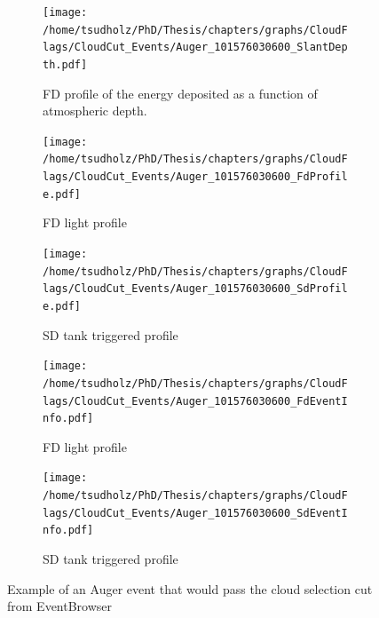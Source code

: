 \begin{figure}
\centering
 \vspace{2cm}
  \begin{subfigure}[b]{\textwidth}
  \centering
  \texttt{[image: /home/tsudholz/PhD/Thesis/chapters/graphs/CloudFlags/CloudCut\_Events/Auger\_101576030600\_SlantDepth.pdf]}
  \caption{FD profile of the energy deposited as a function of atmospheric depth.}
  \end{subfigure}
 \vspace{0.5cm}
  \begin{subfigure}[b]{0.45\textwidth}
  	\centering
  	\texttt{[image: /home/tsudholz/PhD/Thesis/chapters/graphs/CloudFlags/CloudCut\_Events/Auger\_101576030600\_FdProfile.pdf]}
  	\caption{FD light profile}
  \end{subfigure}
  \begin{subfigure}[b]{0.45\textwidth}
  	\centering
  	\texttt{[image: /home/tsudholz/PhD/Thesis/chapters/graphs/CloudFlags/CloudCut\_Events/Auger\_101576030600\_SdProfile.pdf]}
  	\caption{SD tank triggered profile}
  \end{subfigure}

  \begin{subfigure}[b]{0.45\textwidth}
  	\centering
	\texttt{[image: /home/tsudholz/PhD/Thesis/chapters/graphs/CloudFlags/CloudCut\_Events/Auger\_101576030600\_FdEventInfo.pdf]}
  	\caption{FD light profile}
  \end{subfigure}
  \begin{subfigure}[b]{0.45\textwidth}
  	\centering
	\texttt{[image: /home/tsudholz/PhD/Thesis/chapters/graphs/CloudFlags/CloudCut\_Events/Auger\_101576030600\_SdEventInfo.pdf]}
  	\caption{SD tank triggered profile}
  \end{subfigure}
  \caption{Example of an Auger event that would pass the cloud selection cut from EventBrowser}
\end{figure}

